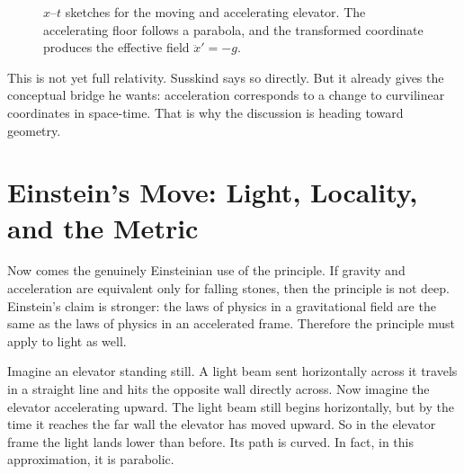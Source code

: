 \begin{figure}[ht]
\centering
{}

\caption{$x$--$t$ sketches for the moving and accelerating elevator. The accelerating floor follows a parabola, and the transformed coordinate produces the effective field $\ddot x'=-g$.}
\end{figure}

This is not yet full relativity. Susskind says so directly. But it already gives the conceptual bridge he wants: acceleration corresponds to a change to curvilinear coordinates in space-time. That is why the discussion is heading toward geometry.

\section{Einstein's Move: Light, Locality, and the Metric}

Now comes the genuinely Einsteinian use of the principle. If gravity and acceleration are equivalent only for falling stones, then the principle is not deep. Einstein's claim is stronger: the laws of physics in a gravitational field are the same as the laws of physics in an accelerated frame. Therefore the principle must apply to light as well.

Imagine an elevator standing still. A light beam sent horizontally across it travels in a straight line and hits the opposite wall directly across. Now imagine the elevator accelerating upward. The light beam still begins horizontally, but by the time it reaches the far wall the elevator has moved upward. So in the elevator frame the light lands lower than before. Its path is curved. In fact, in this approximation, it is parabolic.

